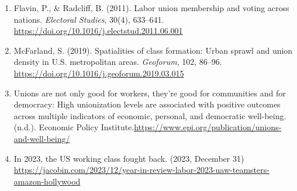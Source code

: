 \documentclass[11pt]{article}\usepackage[]{graphicx}\usepackage[]{xcolor}
\begin{document}
\begin{enumerate}
  \item Flavin, P., \& Radcliff, B. (2011). Labor union membership and voting across nations. \textit{Electoral Studies}, 30(4), 633–641. \url{https://doi.org/10.1016/j.electstud.2011.06.001}
  
  \item McFarland, S. (2019). Spatialities of class formation: Urban sprawl and union density in U.S. metropolitan areas. \textit{Geoforum}, 102, 86–96. \url{https://doi.org/10.1016/j.geoforum.2019.03.015}

  \item Unions are not only good for workers, they’re good for communities and for democracy: High unionization levels are associated with positive outcomes across multiple indicators of economic, personal, and democratic well-being. (n.d.). Economic Policy Institute.\url{https://www.epi.org/publication/unions-and-well-being/}

  \item In 2023, the US working class fought back. (2023, December 31) \url {https://jacobin.com/2023/12/year-in-review-labor-2023-uaw-teamsters-amazon-hollywood}
\end{enumerate}
\end{document}
